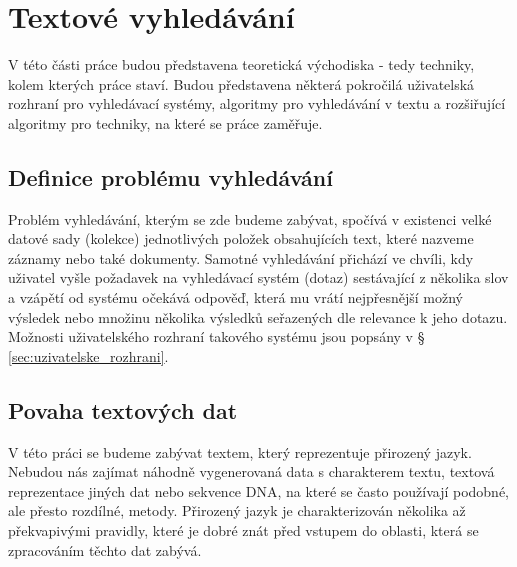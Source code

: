 \documentclass[11pt,letterpaper,oneside,openright]{book}
\begin{document}


\chapter{Textové vyhledávání}
V této části práce budou představena teoretická východiska - tedy techniky,
kolem kterých práce staví. Budou představena některá pokročilá uživatelská
rozhraní pro vyhledávací systémy, algoritmy pro vyhledávání v textu a
rozšiřující algoritmy pro techniky, na které se práce zaměřuje.

\section{Definice problému vyhledávání}
Problém vyhledávání, kterým se zde budeme zabývat, spočívá v existenci velké
datové sady (kolekce) jednotlivých položek obsahujících text, které nazveme
záznamy nebo také dokumenty. Samotné vyhledávání přichází ve chvíli, kdy
uživatel vyšle požadavek na vyhledávací systém (dotaz) sestávající z několika
slov a vzápětí od systému očekává odpověď, která mu vrátí nejpřesnější možný
výsledek nebo množinu několika výsledků seřazených dle relevance k jeho dotazu.
Možnosti uživatelského rozhraní takového systému jsou popsány v
\S\,\ref{sec:uzivatelske_rozhrani}.

\section{Povaha textových dat}
V této práci se budeme zabývat textem, který reprezentuje přirozený jazyk.
Nebudou nás zajímat náhodně vygenerovaná data s charakterem textu, textová
reprezentace jiných dat nebo sekvence DNA, na které se často používají podobné,
ale přesto rozdílné, metody. Přirozený jazyk je charakterizován několika až
překvapivými pravidly, které je dobré znát před vstupem do oblasti, která se
zpracováním těchto dat zabývá.
\end{document}
